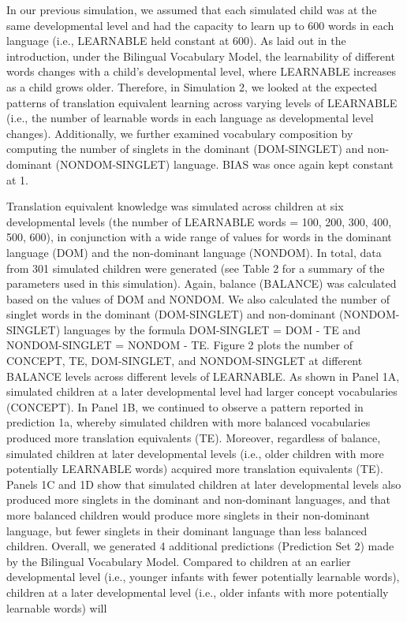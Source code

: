 \documentclass[
  english,
  ,man,floatsintext]{apa6}
\begin{document}
In our previous simulation, we assumed that each simulated child was at the same developmental level and had the capacity to learn up to 600 words in each language (i.e., LEARNABLE held constant at 600). As laid out in the introduction, under the Bilingual Vocabulary Model, the learnability of different words changes with a child's developmental level, where LEARNABLE increases as a child grows older. Therefore, in Simulation 2, we looked at the expected patterns of translation equivalent learning across varying levels of LEARNABLE (i.e., the number of learnable words in each language as developmental level changes). Additionally, we further examined vocabulary composition by computing the number of singlets in the dominant (DOM-SINGLET) and non-dominant (NONDOM-SINGLET) language. BIAS was once again kept constant at 1.

Translation equivalent knowledge was simulated across children at six developmental levels (the number of LEARNABLE words = 100, 200, 300, 400, 500, 600), in conjunction with a wide range of values for words in the dominant language (DOM) and the non-dominant language (NONDOM). In total, data from 301 simulated children were generated (see Table 2 for a summary of the parameters used in this simulation). Again, balance (BALANCE) was calculated based on the values of DOM and NONDOM. We also calculated the number of singlet words in the dominant (DOM-SINGLET) and non-dominant (NONDOM-SINGLET) languages by the formula DOM-SINGLET = DOM - TE and NONDOM-SINGLET = NONDOM - TE. Figure 2 plots the number of CONCEPT, TE, DOM-SINGLET, and NONDOM-SINGLET at different BALANCE levels across different levels of LEARNABLE. As shown in Panel 1A, simulated children at a later developmental level had larger concept vocabularies (CONCEPT). In Panel 1B, we continued to observe a pattern reported in prediction 1a, whereby simulated children with more balanced vocabularies produced more translation equivalents (TE). Moreover, regardless of balance, simulated children at later developmental levels (i.e., older children with more potentially LEARNABLE words) acquired more translation equivalents (TE). Panels 1C and 1D show that simulated children at later developmental levels also produced more singlets in the dominant and non-dominant languages, and that more balanced children would produce more singlets in their non-dominant language, but fewer singlets in their dominant language than less balanced children. Overall, we generated 4 additional predictions (Prediction Set 2) made by the Bilingual Vocabulary Model. Compared to children at an earlier developmental level (i.e., younger infants with fewer potentially learnable words), children at a later developmental level (i.e., older infants with more potentially learnable words) will
\end{document}
